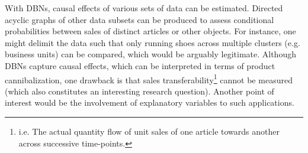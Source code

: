 With \acp{DBN}, causal effects of various sets of data can be estimated. Directed acyclic graphs of other data subsets can be produced to assess conditional probabilities between sales of distinct articles or other objects. For instance, one might delimit the data such that only running shoes across multiple clusters (e.g. business units) can be compared, which would be arguably legitimate. Although \acp{DBN} capture causal effects, which can be interpreted in terms of product cannibalization, one drawback is that sales transferability\footnote{i.e. The actual quantity flow of unit sales of one article towards another across successive time-points.} cannot be measured (which also constitutes an interesting research question). Another point of interest would be the involvement of explanatory variables to such applications.

